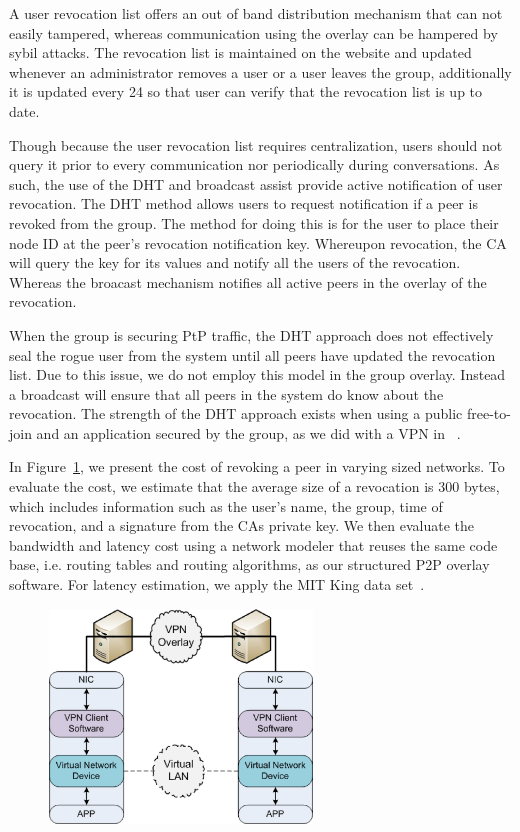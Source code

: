 \documentclass[conference]{IEEEtran}
\begin{document}
A user revocation list offers an out of band distribution mechanism that can
not easily tampered, whereas communication using the overlay can be hampered
by sybil attacks.  The revocation list is maintained on the website and updated
whenever an administrator removes a user or a user leaves the group,
additionally it is updated every 24 so that user can verify that the revocation
list is up to date.

Though because the user revocation list requires centralization, users should
not query it prior to every communication nor periodically during conversations.
As such, the use of the DHT and broadcast assist provide active notification of
user revocation.  The DHT method allows users to request notification if a peer
is revoked from the group.  The method for doing this is for the user to place
their node ID at the peer's revocation notification key.  Whereupon revocation,
the CA will query the key for its values and notify all the users of the
revocation.  Whereas the broacast mechanism notifies all active peers in the
overlay of the revocation.

When the group is securing PtP traffic, the DHT approach does not effectively
seal the rogue user from the system until all peers have updated the revocation
list.  Due to this issue, we do not employ this model in the group overlay.
Instead a broadcast will ensure that all peers in the system do know about
the revocation.  The strength of the DHT approach exists when using a public
free-to-join and an application secured by the group, as we did with a VPN in
~\cite{nsdi10}.

In Figure~\ref{fig:broadcast_revocation}, we present the cost of revoking a
peer in varying sized networks.  To evaluate the cost, we estimate that the
average size of a revocation is 300 bytes, which includes information such
as the user's name, the group, time of revocation, and a signature from the
CAs private key.  We then evaluate the bandwidth and latency cost using a
network modeler that reuses the same code base, i.e. routing tables and routing
algorithms, as our structured P2P overlay software.  For latency estimation,
we apply the MIT King data set~\cite{king_data}.

\begin{figure}[ht]
\centering
\includegraphics[width=2.75in]{vpn.png.eps}
\caption{}
\label{fig:broadcast_revocation}
\end{figure}
\end{document}
